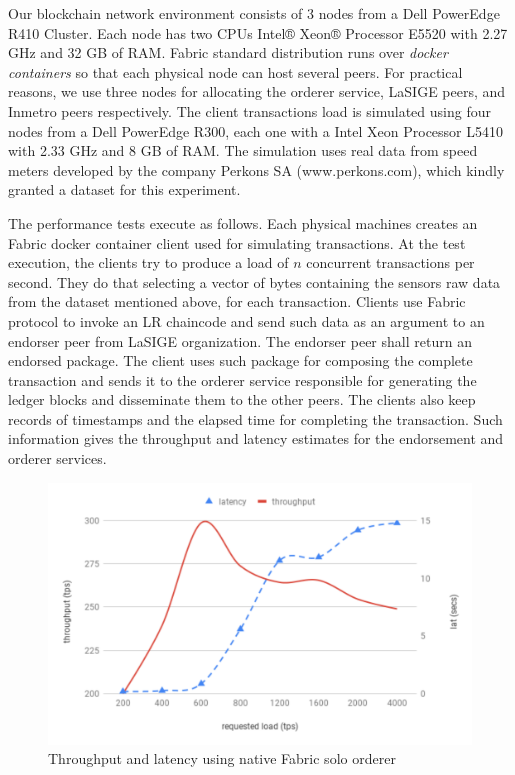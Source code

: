 \documentclass[journal]{IEEEtran}
\begin{document}
Our blockchain network environment consists of 3 nodes from a Dell PowerEdge R410 Cluster.
Each node has two CPUs Intel® Xeon® Processor E5520 with 2.27 GHz and 32 GB of RAM.
Fabric standard distribution runs over \emph{docker containers} so that each physical node can host several peers.
For practical reasons, we use three nodes for allocating the orderer service, LaSIGE peers, and Inmetro peers respectively.
The client transactions load is simulated using four nodes from a Dell PowerEdge R300, each one with a Intel Xeon Processor L5410 with 2.33 GHz and 8 GB of RAM.
The simulation uses real data from speed meters developed by the company Perkons SA (www.perkons.com), which kindly granted a dataset for this experiment.

The performance tests execute as follows.
Each physical machines creates an Fabric docker container client used for simulating transactions.
At the test execution, the clients try to produce a load of $n$ concurrent transactions per second.
They do that selecting a vector of bytes containing the sensors raw data from the dataset mentioned above, for each transaction.
Clients use Fabric protocol to invoke an LR chaincode and send such data as an argument to an endorser peer from LaSIGE organization.
The endorser peer shall return an endorsed package.
The client uses such package for composing the complete transaction and sends it to the orderer service responsible for generating the ledger blocks and disseminate them to the other peers.
The clients also keep records of timestamps and the elapsed time for completing the transaction.
Such information gives the throughput and latency estimates for the endorsement and orderer services.

\begin{figure}[!t]
\centering
\includegraphics[width=.45\textwidth]{chartsolo} %
\caption{Throughput and latency using native Fabric solo orderer}
\label{f:latth}
\end{figure}
\end{document}
